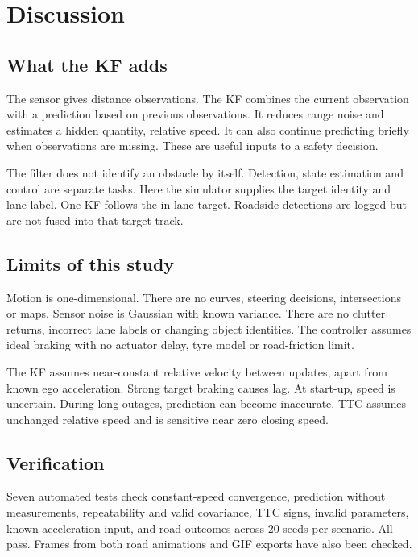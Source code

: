 \documentclass[11pt,a4paper]{article}
\begin{document}
\clearpage\section{Discussion}
\subsection{What the KF adds}
The sensor gives distance observations. The KF combines the current observation with a prediction based on previous observations. It reduces range noise and estimates a hidden quantity, relative speed. It can also continue predicting briefly when observations are missing. These are useful inputs to a safety decision.\par

The filter does not identify an obstacle by itself. Detection, state estimation and control are separate tasks. Here the simulator supplies the target identity and lane label. One KF follows the in-lane target. Roadside detections are logged but are not fused into that target track.\par

\subsection{Limits of this study}
Motion is one-dimensional. There are no curves, steering decisions, intersections or maps. Sensor noise is Gaussian with known variance. There are no clutter returns, incorrect lane labels or changing object identities. The controller assumes ideal braking with no actuator delay, tyre model or road-friction limit.\par

The KF assumes near-constant relative velocity between updates, apart from known ego acceleration. Strong target braking causes lag. At start-up, speed is uncertain. During long outages, prediction can become inaccurate. TTC assumes unchanged relative speed and is sensitive near zero closing speed.\par

\subsection{Verification}
Seven automated tests check constant-speed convergence, prediction without measurements, repeatability and valid covariance, TTC signs, invalid parameters, known acceleration input, and road outcomes across 20 seeds per scenario. All pass. Frames from both road animations and GIF exports have also been checked.\par
\end{document}
